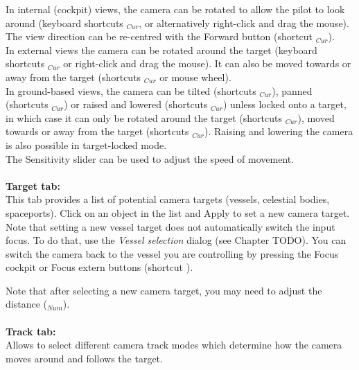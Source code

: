 \documentclass[Orbiter User Manual.tex]{subfiles}
\begin{document}
\noindent
In internal (cockpit) views, the camera can be rotated to allow the pilot to look around (keyboard shortcuts \Alt\DArrow\UArrow\RArrow\LArrow$_{Cur}$, or alternatively right-click and drag the mouse). The view direction can be re-centred with the Forward button (shortcut \Home$_{Cur}$).\\
In external views the camera can be rotated around the target (keyboard shortcuts \Ctrl\DArrow\UArrow\RArrow\LArrow$_{Cur}$ or right-click and drag the mouse). It can also be moved towards or away from the target (shortcuts $_{Cur}$ or mouse wheel).\\
In ground-based views, the camera can be tilted (shortcuts \DArrow\UArrow\RArrow\LArrow$_{Cur}$), panned (shortcuts \Ctrl\DArrow\UArrow\RArrow\LArrow$_{Cur}$) or raised and lowered (shortcuts $_{Cur}$) unless locked onto a target, in which case it can only be rotated around the target (shortcuts \Ctrl\RArrow\LArrow$_{Cur}$), moved towards or away from the target (shortcuts \Ctrl\DArrow\UArrow$_{Cur}$). Raising and lowering the camera is also possible in target-locked mode.\\
The Sensitivity slider can be used to adjust the speed of movement.\\
\\
\textbf{Target tab:}\\
This tab provides a list of potential camera targets (vessels, celestial bodies, spaceports). Click on an object in the list and Apply to set a new camera target. Note that setting a new vessel target does not automatically switch the input focus. To do that, use the \textit{Vessel selection} dialog (see Chapter TODO). You can switch the camera back to the vessel you are controlling by pressing the Focus cockpit or Focus extern buttons (shortcut ).\\

\begin{figure}[H]
	\centering
\end{figure}

\noindent
Note that after selecting a new camera target, you may need to adjust the distance ($_{Num}$).\\
\\
\textbf{Track tab:}\\
Allows to select different camera track modes which determine how the camera moves around and follows the target.\\
\end{document}
